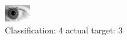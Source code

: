 \begin{figure}[h!]
\begin{center}
\includegraphics[width=0.60\columnwidth]{figures/ID266_class_4_target_3.png}
\end{center}
\caption{ Classification: 4 actual target: 3}
\label{fig:ID266_class_4_target_3}
\end{figure}
